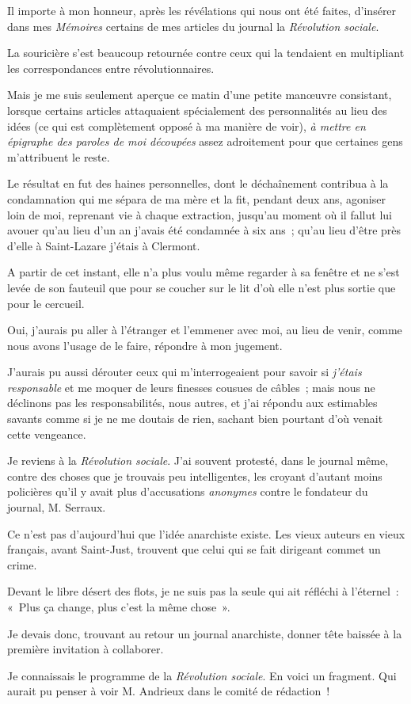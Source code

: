 \documentclass[french,twoside]{book} %
\newcommand\chaptercont{} %
\begin{document}
\chaptercont
\noindent Il importe à mon honneur, après les révélations qui nous ont été faites, d’insérer dans mes \emph{Mémoires} certains de mes articles du journal la \emph{Révolution sociale}.\par
La souricière s’est beaucoup retournée contre ceux qui la tendaient en multipliant les correspondances entre révolutionnaires.\par
Mais je me suis seulement aperçue ce matin d’une petite manœuvre consistant, lorsque certains articles attaquaient spécialement des personnalités au lieu des idées (ce qui est complètement opposé à ma manière de voir), \emph{à mettre en épigraphe des paroles de moi découpées} assez adroitement pour que certaines gens m’attribuent le reste.\par
Le résultat en fut des haines personnelles, dont le déchaînement contribua à la condamnation qui me sépara de ma mère et la fit, pendant deux ans, agoniser loin de moi, reprenant vie à  chaque extraction, jusqu’au moment où il fallut lui avouer qu’au lieu d’un an j’avais été condamnée à six ans ; qu’au lieu d’être près d’elle à Saint-Lazare j’étais à Clermont.\par
A partir de cet instant, elle n’a plus voulu même regarder à sa fenêtre et ne s’est levée de son fauteuil que pour se coucher sur le lit d’où elle n’est plus sortie que pour le cercueil.\par
Oui, j’aurais pu aller à l’étranger et l’emmener avec moi, au lieu de venir, comme nous avons l’usage de le faire, répondre à mon jugement.\par
J’aurais pu aussi dérouter ceux qui m’interrogeaient pour savoir si \emph{j’étais responsable} et me moquer de leurs finesses cousues de câbles ; mais nous ne déclinons pas les responsabilités, nous autres, et j’ai répondu aux estimables savants comme si je ne me doutais de rien, sachant bien pourtant d’où venait cette vengeance.\par
\bigbreak
\noindent Je reviens à la \emph{Révolution sociale}. J’ai souvent protesté, dans le journal même, contre des choses que je trouvais peu intelligentes, les croyant d’autant moins policières qu’il y avait plus d’accusations \emph{anonymes} contre le fondateur du journal, M. Serraux.\par
Ce n’est pas d’aujourd’hui que l’idée anarchiste existe. Les vieux auteurs en vieux français, avant  Saint-Just, trouvent que celui qui se fait dirigeant commet un crime.\par
Devant le libre désert des flots, je ne suis pas la seule qui ait réfléchi à l’éternel : « Plus ça change, plus c’est la même chose ».\par
Je devais donc, trouvant au retour un journal anarchiste, donner tête baissée à la première invitation à collaborer.\par
Je connaissais le programme de la \emph{Révolution sociale}. En voici un fragment. Qui aurait pu penser à voir M. Andrieux dans le comité de rédaction !\par
\end{document}
